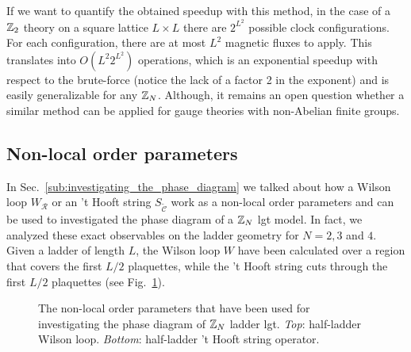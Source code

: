 If we want to quantify the obtained speedup with this method, in the case of a $\mathbb{Z}_2$ theory on a square lattice $L \times L$ there are $2^{L^2}$ possible clock configurations.
For each configuration, there are at most $L^2$ magnetic fluxes to apply.
This translates into $O(L^2 2^{L^2})$ operations, which is an exponential speedup with respect to the brute-force (notice the lack of a factor 2 in the exponent) and is easily generalizable for any $\mathbb{Z}_N$.
Although, it remains an open question whether a similar method can be applied for gauge theories with non-Abelian finite groups.



\subsection{Non-local order parameters}%
\label{sub:non_local_order_parameters}

In Sec.~\ref{sub:investigating_the_phase_diagram} we talked about how a Wilson loop $W_{\mathcal{R}}$ or an 't Hooft string $S_{\tilde{\mathcal{C}}}$ work as a non-local order parameters and can be used to investigated the phase diagram of a $\mathbb{Z}_N$ \ac{lgt} model.
In fact, we analyzed these exact observables on the ladder geometry for $N = 2,3$ and $4$.
Given a ladder of length $L$, the Wilson loop $W$ have been calculated over a region that covers the first $L/2$ plaquettes, while the 't Hooft string cuts through the first $L/2$ plaquettes (see Fig.~\ref{fig:nlop_ladder}).

\begin{figure}[h]
    \centering
    
    \caption{The non-local order parameters that have been used for investigating the phase diagram of $\mathbb{Z}_N$ ladder \ac{lgt}.
    \emph{Top}: half-ladder Wilson loop.
    \emph{Bottom}: half-ladder 't Hooft string operator.}%
    \label{fig:nlop_ladder}
\end{figure}
